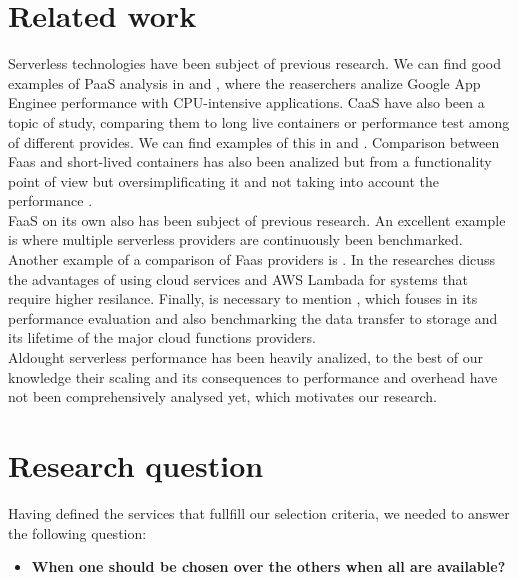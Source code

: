 \documentclass[11pt]{article}
\begin{document}
\section{Related work}

Serverless technologies have been subject of previous research. We can find good examples of PaaS analysis in \cite{googleappengine} and \cite{googleappengine2}, where the reaserchers analize Google App Enginee performance with CPU-intensive applications. CaaS have also been a topic of study, comparing them to long live containers or performance test among of different provides. We can find examples of this in \cite{cc} and \cite{dd}. Comparison between Faas and short-lived containers has also been analized but from a functionality point of view but oversimplificating it and not taking into account the performance \cite{ee}\cite{ff}\cite{gg}. \\
 
FaaS on its own also has been subject of previous research. An excellent example is \cite{aa} where multiple serverless providers are continuously been benchmarked. Another example of a comparison of Faas providers is \cite{bb}. In \cite{14} the researches dicuss the advantages of using cloud services and AWS Lambada for systems that require higher resilance. Finally, is necessary to mention \cite{https://sci-hub.se/10.1002/cpe.4792}, which fouses in its performance evaluation and also benchmarking the data transfer to storage and its lifetime of the major cloud functions providers.  \\

Aldought serverless performance has been heavily analized, to the best of our knowledge their scaling and its consequences to performance and overhead have not been comprehensively analysed yet, which motivates our research.



\section{Research question}
Having defined the services that fullfill our selection criteria, we needed to answer the following question:

\begin{itemize}
\item \textbf{When one should be chosen over the others when all are available?}
\end{itemize}
\end{document}
